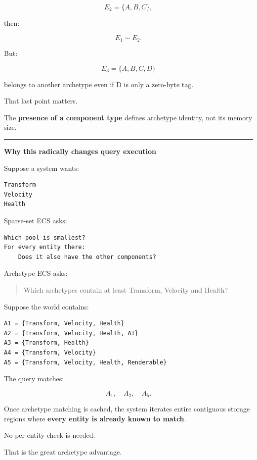 \[
E_2=\{A,B,C\},
\]

then:

\[
E_1\sim E_2.
\]

But:

\[
E_3=\{A,B,C,D\}
\]

belongs to another archetype even if D is only a zero-byte tag.

That last point matters.

The \textbf{presence of a component type} defines archetype identity, not its memory size.

\begin{center}\rule{0.5\linewidth}{0.5pt}\end{center}

\textbf{Why this radically changes query execution}

Suppose a system wants:

\begin{verbatim}
Transform
Velocity
Health
\end{verbatim}

Sparse-set ECS asks:

\begin{verbatim}
Which pool is smallest?
For every entity there:
    Does it also have the other components?
\end{verbatim}

Archetype ECS asks:

\begin{quote}
Which archetypes contain at least Transform, Velocity and Health?
\end{quote}

Suppose the world contains:

\begin{verbatim}
A1 = {Transform, Velocity, Health}
A2 = {Transform, Velocity, Health, AI}
A3 = {Transform, Health}
A4 = {Transform, Velocity}
A5 = {Transform, Velocity, Health, Renderable}
\end{verbatim}

The query matches:

\[
A_1,\quad A_2,\quad A_5.
\]

Once archetype matching is cached, the system iterates entire contiguous storage regions where \textbf{every entity is already known to match}.

No per-entity  check is needed.

That is the great archetype advantage.

